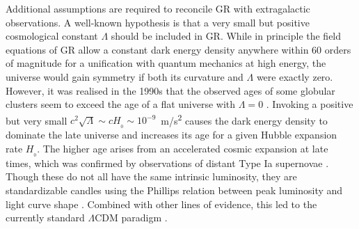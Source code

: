 \documentclass[fleqn,usenatbib,useAMS,onecolumn]{mnras} %
\begin{document}
Additional assumptions are required to reconcile GR with extragalactic observations. A well-known hypothesis is that a very small but positive cosmological constant $\Lambda$ should be included in GR. While in principle the field equations of GR allow a constant dark energy density anywhere within $60$ orders of magnitude for a unification with quantum mechanics at high energy, the universe would gain symmetry if both its curvature and $\Lambda$ were exactly zero. However, it was realised in the 1990s that the observed ages of some globular clusters seem to exceed the age of a flat universe with $\Lambda = 0$ \citep{Bolte_1995, Jimenez_1996}. Invoking a positive but very small $c^2\sqrt{\Lambda} \sim c H_{_0} \sim 10^{-9}$~m/s\textsuperscript{2} causes the dark energy density to dominate the late universe and increases its age for a given Hubble expansion rate $H_{_0}$. The higher age arises from an accelerated cosmic expansion at late times, which was confirmed by observations of distant Type Ia supernovae \citep{Riess_1998, Perlmutter_1999}. Though these do not all have the same intrinsic luminosity, they are standardizable candles using the Phillips relation between peak luminosity and light curve shape \citep{Phillips_1993, Phillips_1999}. Combined with other lines of evidence, this led to the currently standard $\Lambda$CDM paradigm \citep{Efstathiou_1990, Ostriker_Steinhardt_1995}.
\end{document}
